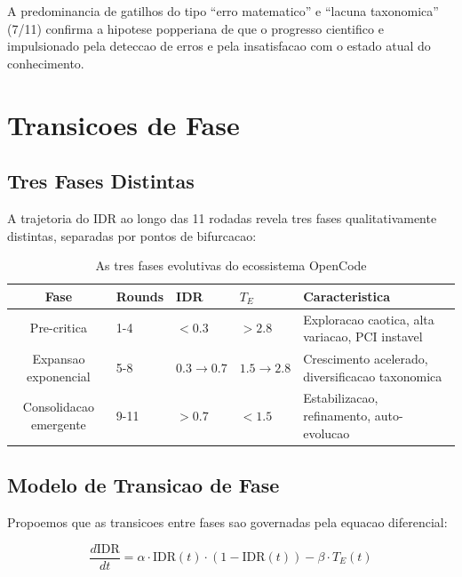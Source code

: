 \documentclass[5p]{elsarticle}
\begin{document}
A predominancia de gatilhos do tipo ``erro matematico'' e ``lacuna taxonomica''
(7/11) confirma a hipotese popperiana de que o progresso cientifico e
impulsionado pela deteccao de erros e pela insatisfacao com o estado atual
do conhecimento.

\section{Transicoes de Fase}

\subsection{Tres Fases Distintas}

A trajetoria do IDR ao longo das 11 rodadas revela tres fases qualitativamente
distintas, separadas por pontos de bifurcacao:

\begin{table}[H]
  \centering
  \caption{As tres fases evolutivas do ecossistema OpenCode}
  \label{tab:fases}
  \begin{tabular}{cp{3cm}p{2cm}p{3cm}p{3cm}}
    \toprule
    \textbf{Fase} & \textbf{Rounds} & \textbf{IDR} & $T_E$ & \textbf{Caracteristica} \\
    \midrule
    Pre-critica & 1-4 & $<0.3$ & $>2.8$ & Exploracao caotica, alta variacao, PCI instavel \\
    Expansao exponencial & 5-8 & $0.3\to 0.7$ & $1.5\to 2.8$ & Crescimento acelerado, diversificacao taxonomica \\
    Consolidacao emergente & 9-11 & $>0.7$ & $<1.5$ & Estabilizacao, refinamento, auto-evolucao \\
    \bottomrule
  \end{tabular}
\end{table}

\subsection{Modelo de Transicao de Fase}

Propoemos que as transicoes entre fases sao governadas pela equacao
diferencial:

\begin{equation}
  \frac{d \text{IDR}}{dt} = \alpha \cdot \text{IDR}(t) \cdot (1 - \text{IDR}(t)) - \beta \cdot T_E(t)
\end{equation}
\end{document}
